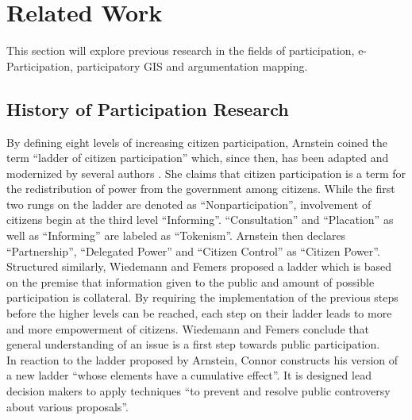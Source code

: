 \section{Related Work}
\label{chap:related_work}
This section will explore previous research in the fields of participation, e-Participation, participatory GIS and argumentation mapping.%



\subsection{History of Participation Research}
By defining eight levels of increasing citizen participation, Arnstein \cite{Arnstein1969_citizen_participation} coined the term ``ladder of citizen participation'' which, since then, has been adapted and modernized by several authors \cite{Connor1988_new_ladder,carver2003future,Collins2009_social_learning,you2009_participatory_map_based,Cai2009_spatial_annotation_deliberation,Macintosh2004_eParticipation_characterization,Schlossberg2005_PPGIS}. She claims that citizen participation is a term for the redistribution of power from the government among citizens. While the first two rungs on the ladder are denoted as ``Nonparticipation'', involvement of citizens begin at the third level ``Informing''. ``Consultation'' and ``Placation'' as well as ``Informing'' are labeled as ``Tokenism''. Arnstein then declares ``Partnership'', ``Delegated Power'' and ``Citizen Control'' as ``Citizen Power''.\\
Structured similarly, Wiedemann and Femers \cite{Wiedemann1993355} proposed a ladder which is based on the premise that information given to the public and amount of possible participation is collateral. By requiring the implementation of the previous steps before the higher levels can be reached, each step on their ladder leads to more and more empowerment of citizens. Wiedemann and Femers conclude that general understanding of an issue is a first step towards public participation.\\
In reaction to the ladder proposed by Arnstein, Connor \cite{Connor1988_new_ladder} constructs his version of a new ladder ``whose elements have a cumulative effect''. It is designed lead decision makers to apply techniques ``to prevent and resolve public controversy about various proposals''. %

